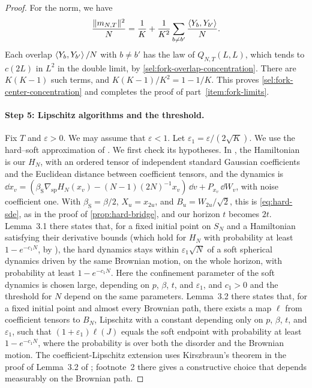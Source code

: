 \begin{proof}
For the norm, we have
\[
 \frac{\lVert m_{N,T}\rVert^2}N=\frac1K+\frac1{K^2}\sum_{b\ne b'}
 \frac{\left\langle Y_b,Y_{b'}\right\rangle}N.
\]
Each overlap $\left\langle Y_b,Y_{b'}\right\rangle/N$ with $b\ne b'$ has the law of
$Q_{N,T}(L,L)$, which tends to $c(2L)$ in $L^2$ in the double limit, by
\eqref{sel:fork-overlap-concentration}. There are $K(K-1)$ such terms, and
$K(K-1)/K^2=1-1/K$. This proves \eqref{sel:fork-center-concentration} and
completes the proof of part~\ref{item:fork-limits}.

\paragraph{Step 5: Lipschitz algorithms and the threshold.}
Fix $T$ and $\varepsilon>0$. We may assume that $\varepsilon<1$. Let
$\varepsilon_1=\varepsilon/(2\sqrt K)$. We use the hard--soft approximation
of \cite[Lemmas~3.1--3.2]{sellke2024}. We first check its hypotheses.
In \cite{sellke2024}, the Hamiltonian is our $H_N$, with an ordered tensor of
independent standard Gaussian coefficients and the Euclidean distance between
coefficient tensors, and the dynamics is
$\dd x_v=(\beta_{\mathrm S}\nabla_{\mathrm{sp}}H_N(x_v)
-(N-1)(2N)^{-1}x_v)\,\dd v+P_{x_v}\,\dd W_v$, with noise coefficient one.
With $\beta_{\mathrm S}=\beta/2$, $X_u=x_{2u}$, and $B_u=W_{2u}/\sqrt2$, this
is \eqref{eq:hard-sde}, as in the proof of \cref{prop:hard-bridge}, and our
horizon $t$ becomes $2t$. Lemma~3.1 there states that, for a fixed initial
point on $S_N$ and a Hamiltonian satisfying their derivative bounds (which
hold for $H_N$ with probability at least $1-e^{-c_1N}$, by
\cite[Proposition~1.11]{sellke2024}), the hard dynamics stays within
$\varepsilon_1\sqrt N$ of a soft spherical dynamics driven by the same
Brownian motion, on the whole horizon, with probability at least
$1-e^{-c_1N}$. Here the confinement parameter of the soft dynamics is chosen large, depending on $p$, $\beta$, $t$, and $\varepsilon_1$, and $c_1>0$ and the
threshold for $N$ depend on the same parameters. Lemma~3.2 there states that, for a fixed initial point and
almost every Brownian path, there exists a map $\ell$ from coefficient tensors
to $B_N$, Lipschitz with a constant depending only on $p$, $\beta$, $t$, and
$\varepsilon_1$, such that $(1+\varepsilon_1)\ell(J)$ equals the soft
endpoint with probability at least $1-e^{-c_1N}$, where the probability is
over both the disorder and the Brownian motion. The coefficient-Lipschitz extension uses Kirszbraun's theorem in the proof of
Lemma~3.2 of \cite{sellke2024}; footnote~2 there gives a constructive choice
that depends measurably on the Brownian path.


\end{proof}
